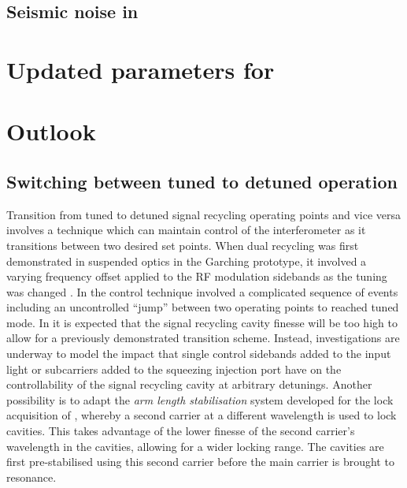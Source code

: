 \subsection{Seismic noise in \ETLF{}}

\section{Updated parameters for \ETLF{}}

\section{Outlook}

\subsection{Switching between tuned to detuned operation}
Transition from tuned to detuned signal recycling operating points and vice versa involves a technique which can maintain control of the interferometer as it transitions between two desired set points. When dual recycling was first demonstrated in suspended optics in the Garching prototype, it involved a varying frequency offset applied to the \gls{RF} modulation sidebands as the tuning was changed \cite{Freise2000}. In \GEO{} the control technique involved a complicated sequence of events \cite{Grote2004} including an uncontrolled ``jump'' between two operating points \cite{Hild2007} to reached tuned mode. In \ETLF{} it is expected that the signal recycling cavity finesse will be too high to allow for a previously demonstrated transition scheme. Instead, investigations are underway to model the impact that single control sidebands added to the input light or subcarriers added to the squeezing injection port have on the controllability of the signal recycling cavity at arbitrary detunings. Another possibility is to adapt the \emph{arm length stabilisation} system developed for the lock acquisition of \ALIGO{} \cite{Mullavey2012, Staley2014}, whereby a second carrier at a different wavelength is used to lock cavities. This takes advantage of the lower finesse of the second carrier's wavelength in the cavities, allowing for a wider locking range. The cavities are first pre-stabilised using this second carrier before the main carrier is brought to resonance.

